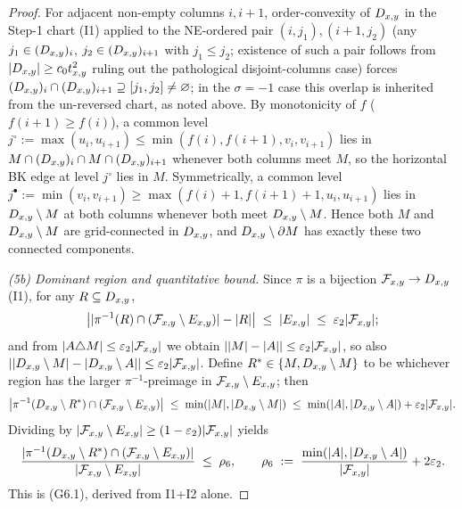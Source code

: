 \begin{proof}
For adjacent non-empty columns $i,i+1$, order-convexity of $D_{x,y}$ in the
Step-1 chart (\textsc{I1}) applied to the NE-ordered pair $(i,j_1),(i+1,j_2)$
(any $j_1\in(D_{x,y})_i$, $j_2\in(D_{x,y})_{i+1}$ with $j_1\le j_2$; existence of
such a pair follows from $|D_{x,y}|\ge c_0 t_{x,y}^2$ ruling out the pathological
disjoint-columns case) forces
$(D_{x,y})_i\cap(D_{x,y})_{i+1}\supseteq[j_1,j_2]\ne\varnothing$; in the
$\sigma=-1$ case this overlap is inherited from the un-reversed chart, as
noted above.
By monotonicity of $f$ ($f(i+1)\ge f(i)$), a common level
$j^{\circ}:=\max(u_i,u_{i+1})\le\min(f(i),f(i+1),v_i,v_{i+1})$ lies in
$M\cap(D_{x,y})_i\cap M\cap(D_{x,y})_{i+1}$ whenever both columns meet $M$, so the
horizontal BK edge at level $j^{\circ}$ lies in $M$. Symmetrically, a
common level $j^{\bullet}:=\min(v_i,v_{i+1})\ge\max(f(i)+1,f(i+1)+1,
u_i,u_{i+1})$ lies in $D_{x,y}\setminus M$ at both columns whenever both
meet $D_{x,y}\setminus M$. Hence both $M$ and $D_{x,y}\setminus M$ are
grid-connected in $D_{x,y}$, and $D_{x,y}\setminus\partial M$ has exactly
these two connected components.

\smallskip
\emph{(5b) Dominant region and quantitative bound.}
Since $\pi$ is a bijection $\mathcal{F}_{x,y}\to D_{x,y}$ (I1), for any $R\subseteq D_{x,y}$,
\[
  \bigl||\pi^{-1}(R)\cap(\mathcal{F}_{x,y}\setminus E_{x,y})|-|R|\bigr|
  \;\le\;|E_{x,y}|\;\le\;\varepsilon_2|\mathcal{F}_{x,y}|;
\]
and from $|A\triangle M|\le\varepsilon_2|\mathcal{F}_{x,y}|$ we obtain
$||M|-|A||\le\varepsilon_2|\mathcal{F}_{x,y}|$, so also
$||D_{x,y}\setminus M|-|D_{x,y}\setminus A||\le\varepsilon_2|\mathcal{F}_{x,y}|$. Define
$R^\ast\in\{M,D_{x,y}\setminus M\}$ to be whichever region has the larger
$\pi^{-1}$-preimage in $\mathcal{F}_{x,y}\setminus E_{x,y}$; then
\[
  \bigl|\pi^{-1}(D_{x,y}\setminus R^\ast)\cap(\mathcal{F}_{x,y}\setminus E_{x,y})\bigr|
  \;\le\;\min(|M|,|D_{x,y}\setminus M|)
  \;\le\;\min(|A|,|D_{x,y}\setminus A|)+\varepsilon_2|\mathcal{F}_{x,y}|.
\]
Dividing by $|\mathcal{F}_{x,y}\setminus E_{x,y}|\ge(1-\varepsilon_2)|\mathcal{F}_{x,y}|$ yields
\begin{equation}\label{eq:G6.1-quant}
  \frac{|\pi^{-1}(D_{x,y}\setminus R^\ast)\cap(\mathcal{F}_{x,y}\setminus E_{x,y})|}
       {|\mathcal{F}_{x,y}\setminus E_{x,y}|}
  \;\le\;\rho_6,\qquad
  \rho_6\;:=\;\frac{\min(|A|,|D_{x,y}\setminus A|)}{|\mathcal{F}_{x,y}|}+2\varepsilon_2.
\end{equation}
This is (G6.1), derived from \textsc{I1}+\textsc{I2} alone.


\end{proof}
